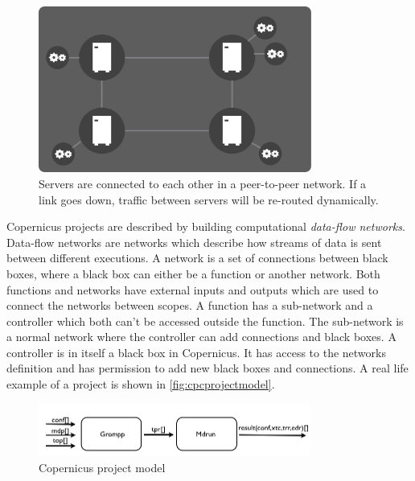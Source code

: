\begin{figure}[H]  
  \centering
  \includegraphics[width=0.8\textwidth]{gfx/peer2peer.pdf}
  \caption{Servers are connected to each other in a peer-to-peer
    network. If a link goes down, traffic between servers will be
    re-routed dynamically.}
  \label{fig:p2p}
\end{figure}

Copernicus projects are described by building computational
\emph{data-flow networks}. Data-flow networks are networks which
describe how streams of data is sent between different executions.  A
network is a set of connections between black boxes, where a black box
can either be a function or another network. Both functions and
networks have external inputs and outputs which are used to connect
the networks between scopes. A function has a sub-network and a
controller which both can't be accessed outside the function. The
sub-network is a normal network where the controller can add
connections and black boxes. A controller is in itself a black box in
Copernicus. It has access to the networks definition and has
permission to add new black boxes and connections. A real life example
of a project is shown in \autoref{fig:cpcprojectmodel}.

\begin{figure}[H]
  \centering
  \includegraphics[width=0.8\textwidth]{gfx/example.png}
  \caption{Copernicus project model}
  \label{fig:cpcprojectmodel}
\end{figure}


